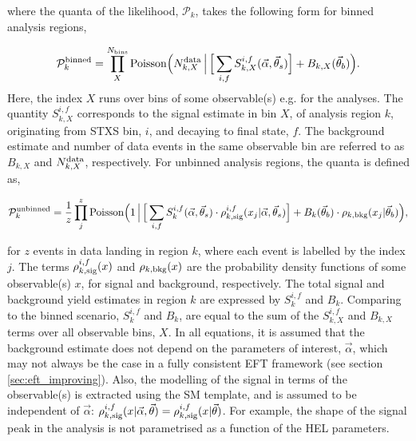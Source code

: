 \noindent
where the quanta of the likelihood, $\mathcal{P}_k$, takes the following form for binned analysis regions,

\begin{equation}
    \mathcal{P}^{\rm{binned}}_k = \prod^{N_{\rm{bins}}}_X {\rm{Poisson}}\Big( N^{\rm{data}}_{k,X} \, \Big| \, \Big[\sum_{i,f} S^{i,f}_{k,X}(\vec{\alpha},\vec{\theta}_s) \Big] + B_{k,X}(\vec{\theta}_b) \Big).  
\end{equation}
\noindent
Here, the index $X$ runs over bins of some observable(s) e.g. \mgg for the \Hgg analyses. The quantity $S^{i,f}_{k,X}$ corresponds to the signal estimate in bin $X$, of analysis region $k$, originating from STXS bin, $i$, and decaying to final state, $f$. The background estimate and number of data events in the same observable bin are referred to as $B_{k,X}$ and $N^{\rm{data}}_{k,X}$, respectively. For unbinned analysis regions, the quanta is defined as,

\begin{equation}
    \mathcal{P}^{\rm{unbinned}}_k = \frac{1}{z} \prod^{z}_j {\rm{Poisson}}\Big(1 \, \Big| \, \Big[\sum_{i,f} S^{i,f}_{k}(\vec{\alpha},\vec{\theta}_s) \cdot \rho^{i,f}_{k,{\rm{sig}}}(x_j|\vec{\alpha},\vec{\theta}_s) \Big] + B_{k}(\vec{\theta}_b)\cdot \rho_{k,{\rm{bkg}}}(x_j|\vec{\theta}_b) \Big),
\end{equation}

\noindent
for $z$ events in data landing in region $k$, where each event is labelled by the index $j$. The terms $\rho^{i,f}_{k,{\rm{sig}}}(x)$ and $\rho_{k,{\rm{bkg}}}(x)$ are the probability density functions of some observable(s) $x$, for signal and background, respectively. The total signal and background yield estimates in region $k$ are expressed by $S^{i,f}_{k}$ and $B_{k}$. Comparing to the binned scenario, $S^{i,f}_{k}$ and $B_{k}$, are equal to the sum of the $S^{i,f}_{k,X}$ and $B_{k,X}$ terms over all observable bins, $X$. In all equations, it is assumed that the background estimate does not depend on the parameters of interest, $\vec{\alpha}$, which may not always be the case in a fully consistent EFT framework (see section \ref{sec:eft_improving}). Also, the modelling of the signal in terms of the observable(s) is extracted using the SM template, and is assumed to be independent of $\vec{\alpha}$: $\rho^{i,f}_{k,{\rm{sig}}}(x|\vec{\alpha},\vec{\theta})=\rho^{i,f}_{k,{\rm{sig}}}(x|\vec{\theta})$. For example, the shape of the signal \mgg peak in the \Hgg analysis is not parametrised as a function of the HEL parameters.

